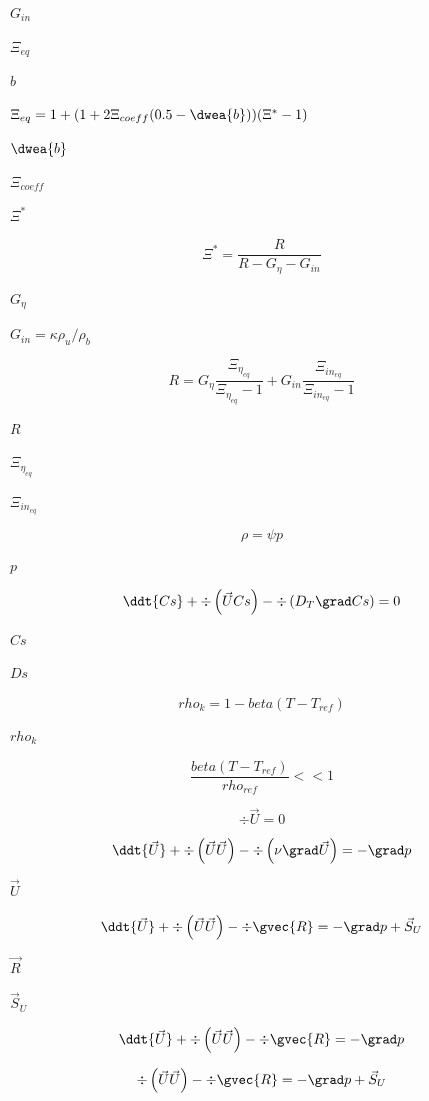 \documentclass{article}
\begin{document}
$ G_{in} $
\pagebreak

$\Xi_{eq}$
\pagebreak

$ b $
\pagebreak

$\Xi_{eq} = 1 + (1 + 2\Xi_{coeff}(0.5 - \dwea{b}))(\Xi^* - 1)$
\pagebreak

$ \dwea{b} $
\pagebreak

$ \Xi_{coeff} $
\pagebreak

$ \Xi^* $
\pagebreak

\[
        \Xi^* = \frac {R}{R - G_\eta - G_{in}}
    \]
\pagebreak

$ G_\eta $
\pagebreak

$ G_{in} = \kappa \rho_{u}/\rho_{b} $
\pagebreak

\[
        R = G_\eta \frac{\Xi_{\eta_{eq}}}{\Xi_{\eta_{eq}} - 1}
          + G_{in} \frac{\Xi_{{in}_{eq}}}{\Xi_{{in}_{eq}} - 1}
    \]
\pagebreak

$ R $
\pagebreak

$ \Xi_{\eta_{eq}} $
\pagebreak

$ \Xi_{{in}_{eq}} $
\pagebreak

\[
    \rho = \psi p
\]
\pagebreak

$        p     $
\pagebreak

\[
    \ddt{Cs} + \div \left(\vec{U} Cs\right) - \div \left(D_T \grad Cs \right)
    = 0
\]
\pagebreak

$        Cs      $
\pagebreak

$        Ds      $
\pagebreak

\[
    rho_{k} = 1 - beta(T - T_{ref})
\]
\pagebreak

$ rho_{k} $
\pagebreak

\[
    \frac{beta(T - T_{ref})}{rho_{ref}} << 1
\]
\pagebreak

\[
        \div \vec{U} = 0
    \]
\pagebreak

\[
        \ddt{\vec{U}}
      + \div \left( \vec{U} \vec{U} \right)
      - \div \left(\nu \grad \vec{U} \right)
      = - \grad p
    \]
\pagebreak

$        \vec{U} $
\pagebreak

\[
        \ddt{\vec{U}} + \div \left( \vec{U} \vec{U} \right) - \div \gvec{R}
      = - \grad p + \vec{S}_U
    \]
\pagebreak

$        \vec{R} $
\pagebreak

$        \vec{S}_U $
\pagebreak

\[
        \ddt{\vec{U}} + \div \left( \vec{U} \vec{U} \right) - \div \gvec{R}
      = - \grad p
    \]
\pagebreak

\[
        \div \left( \vec{U} \vec{U} \right) - \div \gvec{R}
      = - \grad p + \vec{S}_U
    \]
\pagebreak
\end{document}
